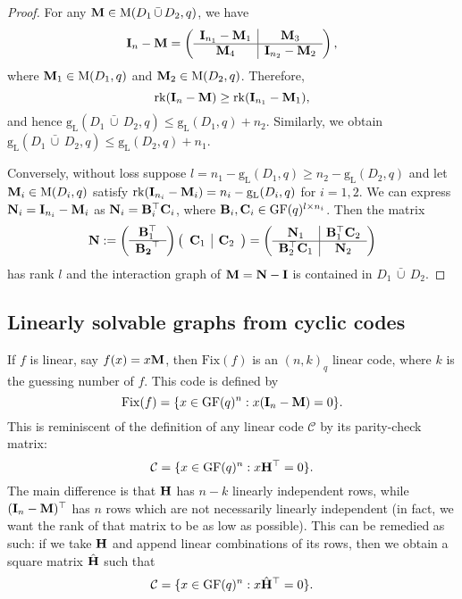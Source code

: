 \documentclass[a4paper, 11pt]{book}
\numberwithin{equation}{section}
\theoremstyle{plain}
\newcommand{\bcup}{\,\bar{\cup}\,}
\newcommand{\linear}[1]{#1_\mathrm{L}}
\newcommand{\matrices}{\mathrm{M}}
\newcommand{\Fix}{\mathrm{Fix}}
\newcommand{\guessing}{\mathrm{g}}
\newcommand{\linearGuessing}{\linear{\guessing}}
\newcommand{\GF}{\mathrm{GF}}
\newcommand{\rank}{\mathrm{rk}}
\renewcommand{\(}{\ldbrack}
\renewcommand{\)}{\rdbrack}
\begin{document}
\begin{proof} \renewcommand*{\arraystretch}{1.5}
For any ${\bf M} \in \matrices(D_1 \bcup D_2, q)$, we have
\[
	{\bf I}_n - {\bf M} = \left(\begin{array}{c|c}
	{\bf I}_{n_1} - {\bf M}_1 & {\bf M}_3\\
	\hline
	{\bf M}_4 & {\bf I}_{n_2} - {\bf M}_2
	\end{array}\right),
\]
where ${\bf M}_1 \in \matrices(D_1, q)$ and ${\bf M}_2 \in \matrices(D_2, q)$. Therefore,
\[
	\rank({\bf I}_n - {\bf M}) \ge \rank({\bf I}_{n_1} - {\bf M}_1),
\]
and hence $\linearGuessing(D_1 \bcup D_2, q) \le \linearGuessing(D_1, q) + n_2$. Similarly, we obtain $\linearGuessing(D_1 \bcup D_2, q) \le \linearGuessing(D_2, q) + n_1$.

Conversely, without loss suppose $l = n_1 - \linearGuessing(D_1, q) \ge n_2 - \linearGuessing(D_2, q)$ and let ${\bf M}_i \in \matrices(D_i, q)$ satisfy $\rank({\bf I}_{n_i} - {\bf M}_i) = n_i - \linearGuessing(D_i, q)$ for $i = 1,2$. We can express ${\bf N}_i = {\bf I}_{n_i} - {\bf M}_i$ as ${\bf N}_i = {\bf B}_i^\top {\bf C}_i$, where ${\bf B}_i, {\bf C}_i \in \GF(q)^{l \times n_i}$. Then the matrix 
\[
	{\bf N} := \left(\begin{array}{c} 
	{{\bf B}_1^\top}\\
	\hline
	{{\bf B_2}^\top}
	\end{array}\right)
	\left( \begin{array}{c|c}
	{\bf C}_1 & {\bf C}_2
	\end{array} \right)
	= \left( \begin{array}{c|c}
	{\bf N}_1 & {\bf B}_1^\top {\bf C}_2\\
	\hline
	{\bf B}_2^\top {\bf C}_1 & {\bf N}_2
	\end{array} \right)
\]
has rank $l$ and the interaction graph of ${\bf M} = {\bf N} - {\bf I}$ is contained in $D_1 \bcup D_2$.
\end{proof}






\subsection{Linearly solvable graphs from cyclic codes} \label{sec:linearly_solvable_cyclic_codes}



If $f$ is linear, say $f(x) = x {\bf M}$, then $\Fix(f)$ is an $(n,k)_q$ linear code, where $k$ is the guessing number of $f$. This code is defined by
\[
	\Fix(f) = \{ x \in \GF(q)^n : x ({\bf I}_n - {\bf M}) = 0 \}.
\]
This is reminiscent of the definition of any linear code $\mathcal{C}$ by its parity-check matrix:
\[
	\mathcal{C} = \{ x \in \GF(q)^n : x {\bf H}^\top = 0 \}.
\]
The main difference is that ${\bf H}$ has $n-k$ linearly independent rows, while $({\bf I}_n - {\bf M})^\top$ has $n$ rows which are not necessarily linearly independent (in fact, we want the rank of that matrix to be as low as possible). This can be remedied as such: if we take ${\bf H}$ and append linear combinations of its rows, then we obtain a square matrix $\hat{\bf H}$ such that 
\[
	\mathcal{C} = \{ x \in \GF(q)^n : x \hat{\bf H}^\top = 0 \}.
\]
\end{document}
